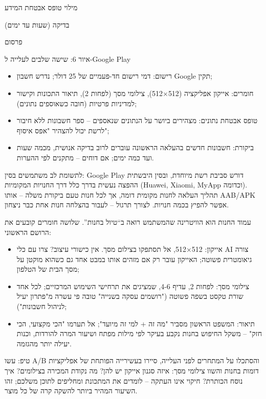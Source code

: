 מילוי טופס אבטחת המידע

בדיקה (שעות עד ימים)

פרסום

\begin{center}\small\color{gray}איור 6: שישה שלבים לעלייה ל-Google Play\end{center}

\begin{itemize}
  \item רישום: דמי רישום חד-פעמיים של 25 דולר; נדרש חשבון Google תקין;
  \item חומרים: אייקון אפליקציה (512×512), צילומי מסך (לפחות 2), תיאור התכונות וקישור למדיניות פרטיות (חובה כשאוספים נתונים);
  \item טופס אבטחת נתונים: מצהירים ביושר על הנתונים שנאספים – ספר חשבונות ללא חיבור לרשת יכול להצהיר "אפס איסוף";
  \item ביקורת: חשבונות חדשים בהעלאה הראשונה עוברים לרוב בדיקה אנושית, מכמה שעות ועד כמה ימים; אם דוחים – מתקנים לפי ההערות.
\end{itemize}

לתשומת לב משתמשים בסין: Google Play דורש סביבת רשת מיוחדת, ובסין היבשתית ההפצה נעשית בדרך כלל דרך החנויות המקומיות (Huawei, Xiaomi, MyApp וכדומה). תהליך העלאה לחנות מקומית דומה, אך לכל חנות טעם ביקורת משלה – אותו AAB/APK אפשר להפיץ בכמה חנויות. לצורך תרגול – לעבור בהצלחה חנות אחת כבר ניצחון.


עמוד החנות הוא הוויטרינה שהמשתמש רואה ב“טיול בחנות”. שלושה חומרים קובעים את הרושם הראשוני:

\begin{itemize}
  \item אייקון: ‏512×512, אל תסתפקו בצילום מסך. אין כישורי עיצוב? צרו עם כלי AI צורה גיאומטרית פשוטה; האייקון עובר רק אם מזהים אותו במבט אחד גם כשהוא מוקטן על מסך הבית של הטלפון;
  \item צילומי מסך: לפחות 2, עדיף 4-6, שמציגים את תרחישי השימוש המרכזיים; לכל אחד שורת טקסט בשפה פשוטה ("רושמים עסקה בשנייה" טובה פי עשרה מ"פתרון יעיל לניהול חשבונות");
  \item תיאור: המשפט הראשון מסביר "מה זה + למי זה מיועד"; אל תערמו "הכי מקצועי, הכי חזק" – משקל החיפוש בחנות נקבע בעיקר לפי מילות מפתח ושיעור המרה להורדות, וכנות יעילה יותר מהגזמה.
\end{itemize}

\begin{tcbinfo}{טיפ: עשו A/B והסתכלו על המתחרים}
לפני העלייה, סיירו בעשירייה הפותחת של אפליקציות דומות בחנות והשוו צילומי מסך: איזה סגנון אייקון יש להן? מה נקודת המכירה בצילומים? איך נוסח הכותרת? חיקוי אינו העתקה – לומדים את המתכונת ומחליפים לתוכן משלכם; זהו השיעור המהיר ביותר להשקה קרה של כל מוצר.

\end{tcbinfo}

